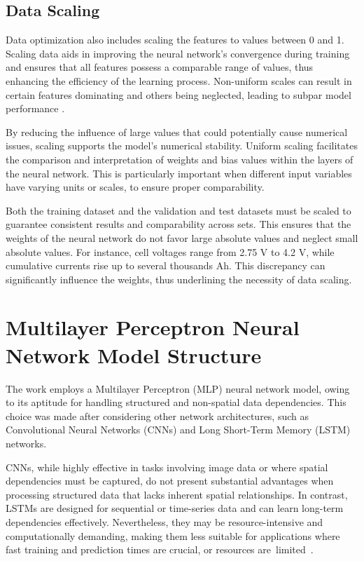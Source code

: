 \documentclass[energies,article,accept,pdftex,moreauthors]{Definitions/mdpi}
\begin{document}
\subsection{Data Scaling}

Data optimization also includes scaling the features to values between 0 and 1. Scaling data aids in improving the neural network's convergence during training and ensures that all features possess a comparable range of values, thus enhancing the efficiency of the learning process. Non-uniform scales can result in certain features dominating and others being neglected, leading to subpar model performance \cite{Salimans.2016}.

By reducing the influence of large values that could potentially cause numerical issues, scaling supports the model's numerical stability. Uniform scaling facilitates the comparison and interpretation of weights and bias values within the layers of the neural network. This is particularly important when different input variables have varying units or scales, to ensure proper comparability.

Both the training dataset and the validation and test datasets must be scaled to guarantee consistent results and comparability across sets. This ensures that the weights of the neural network do not favor large absolute values and neglect small absolute values. For instance, cell voltages range from 2.75 V to 4.2 V, while cumulative currents rise up to several thousands Ah. This discrepancy can significantly influence the weights, thus underlining the necessity of data scaling.


\section{Multilayer Perceptron Neural Network Model Structure}

The work employs a Multilayer Perceptron (MLP) neural network model, owing to its aptitude for handling structured and non-spatial data dependencies. This choice was made after considering other network architectures, such as Convolutional Neural Networks (CNNs) and Long Short-Term Memory (LSTM) networks.

CNNs, while highly effective in tasks involving image data or where spatial dependencies must be captured, do not present substantial advantages when processing structured data that lacks inherent spatial relationships. In contrast, LSTMs are designed for sequential or time-series data and can learn long-term dependencies effectively. Nevertheless, they may be resource-intensive and computationally demanding, making them less suitable for applications where fast training and prediction times are crucial, or resources are~limited~\cite{Li.20182016}.
\end{document}
